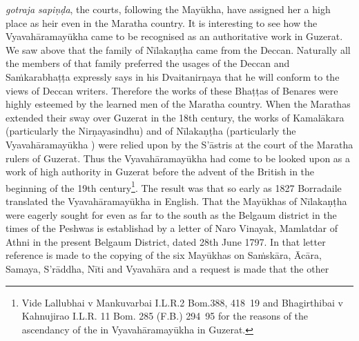 \documentclass[11pt, openany]{book}
\begin{document}
\noindent
\emph{\en gotraja sapiṇḍa}, the courts, following the Mayūkha, have assigned her a high place as heir even in the Maratha country. It is interesting to see how the Vyavahāramayūkha came to be recognised as an authoritative work in Guzerat. We saw above that the family of Nīlakaṇṭha came from the Deccan. Naturally all the members of that family preferred the usages of the Deccan and Saṁkarabhaṭṭa expressly says in his Dvaitanirṇaya that he will conform to the views of Deccan writers. Therefore the works of these Bhaṭṭas of Benares were highly esteemed by the learned men of the Maratha country. When the Marathas extended their sway over Guzerat in the 18th century, the works of Kamalākara (particularly the Nirṇayasindhu) and of Nīlakaṇṭha (particularly the Vyavahāramayūkha ) were relied upon by the S'āstris at the court of the Maratha rulers of Guzerat. Thus the Vyavahāramayūkha had come to be looked upon as a work of high authority in Guzerat before the advent of the British in the beginning of the 19th century\renewcommand{\thefootnote}{1}\footnote{Vide Lallubhai v Mankuvarbai I.L.R.2 Bom.388, 418\textendash\ 19 and Bhagirthibai v Kahnujirao I.L.R. 11 Bom. 285 (F.B.) 294\textendash\ 95 for the reasons of the ascendancy of the in Vyavahāramayūkha in Guzerat.}. The result was that so early as 1827 Borradaile translated the Vyavahāramayūkha in English. That the Mayūkhas of Nīlakaṇṭha were eagerly sought for even as far to the south as the Belgaum district in the times of the Peshwas is establishad by a letter of Naro Vinayak, Mamlatdar of Athni in the present Belgaum District, dated 28th June 1797. In that letter reference is made to the copying of the six Mayūkhas on Saṁskāra, Ācāra, Samaya, S'rāddha, Nīti and Vyavahāra and a request is made that the other

\newpage
\end{document}
